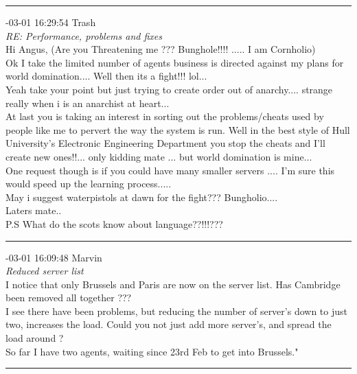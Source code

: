 \begin{mail}
\rule{0.8\textwidth}{.4pt}

{-03-01 16:29:54 Trash}\\
{\itshape RE: Performance, problems and fixes}\\
Hi Angus, (Are you Threatening me ??? Bunghole!!!! ..... I am Cornholio)\\
Ok I take the limited number of agents business is directed against my plans for world domination.... Well then its a fight!!! lol...\\
Yeah take your point but just trying to create order out of anarchy.... strange really when i is an anarchist at heart...\\
At last you is taking an interest in sorting out the problems/cheats used by people like me to pervert the way the system is run. Well in the best style of Hull University's Electronic Engineering Department you stop the cheats and I'll create new ones!!... only kidding mate ... but world domination is mine...\\
One request though is if you could have many smaller servers .... I'm sure this would speed up the learning process..... \\
May i suggest waterpistols at dawn for the fight??? Bungholio....\\
Laters mate..\\
P.S What do the scots know about language??!!!???\\

\rule{0.8\textwidth}{.4pt}

{-03-01 16:09:48 Marvin}\\
{\itshape Reduced server list}\\	
I notice that only Brussels and Paris are now on the server list. Has Cambridge been removed all together ???\\
I see there have been problems, but reducing the number of server's down to just two, increases the load. Could you not just add more server's, and spread the load around ?\\
So far I have two agents, waiting since 23rd Feb to get into Brussels."\\

\rule{0.8\textwidth}{.4pt}


\end{mail}
